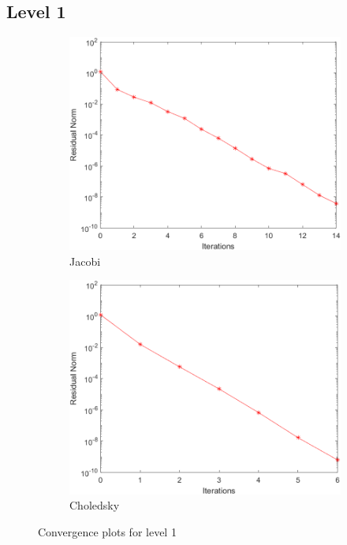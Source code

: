 \documentclass[a4paper, 11pt]{article}
\begin{document}
			
			\subsection*{Level 1}
				\begin{figure}[H]
					\begin{subfigure}{.49\textwidth}
						\centering
						\includegraphics[width=.99\linewidth]{img1/J.png}  
						\caption{Jacobi}
						\label{fig:Jacobi_1}
					\end{subfigure}
					\begin{subfigure}{.49\textwidth}
						\centering
						\includegraphics[width=.99\linewidth]{img1/C.png}  
						\caption{Choledsky}
						\label{fig:Chol_1}
					\end{subfigure}
					\caption{Convergence plots for level 1}
					\label{fig:fig1}
				\end{figure}
			
\end{document}
